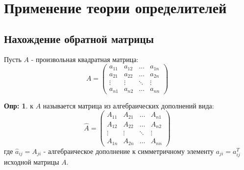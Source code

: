 \documentclass[12pt]{article}
\newcommand{\RN}[1]{%
	\textup{\uppercase\expandafter{\romannumeral#1}}%
}
\theoremstyle{definition}
\newtheorem{defn}{Опр:}
\newcommand{\wht}[1]{\widehat{#1}}
\begin{document}
\lhead{Алгебра-\RN{1}}
\section*{Применение теории определителей}
	
\subsection*{Нахождение обратной матрицы}

Пусть $A$ - произвольная квадратная  матрица:
$$
	A = 
	\begin{pmatrix}
		a_{11} & a_{12} & \dotsc & a_{1n}\\
		a_{21} & a_{22} & \dotsc & a_{2n}\\
		\vdots & \vdots & \ddots& \vdots \\
		a_{n1} & a_{n2} & \dotsc & a_{nn}
	\end{pmatrix}
$$

\begin{defn}
	 к $A$ называется матрица из алгебраических дополнений вида:
	$$
		\wht{A} = 
		\begin{pmatrix}
			A_{11} & A_{21} & \dotsc & A_{n1}\\
			A_{12} & A_{22} & \dotsc & A_{n2}\\
			\vdots & \vdots & \ddots & \vdots \\
			A_{1n} & A_{2n} & \dotsc & A_{nn} 
		\end{pmatrix}
	$$
	где $\wht{a}_{ij} = A_{ji}$ - алгебраическое дополнение к симметричному элементу $a_{ji} = a^T_{ij}$ исходной матрицы $A$.
\end{defn}
\end{document}

